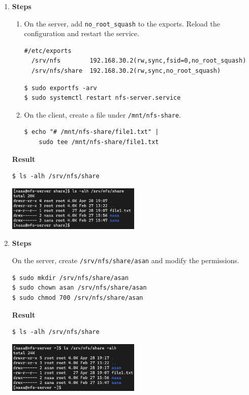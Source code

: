 \documentclass[12pt, a4paper]{article}
\begin{document}
\begin{enumerate}[label=(\alph*)]
    \pagebreak
    \item \textbf{Steps}
    \begin{enumerate}[label=(\arabic*)]
      \item On the server, add \verb|no_root_squash| to the exports. Reload
      the configuration and restart the service.
      \begin{Verbatim}[frame=single]
  #/etc/exports
  /srv/nfs        192.168.30.2(rw,sync,fsid=0,no_root_squash)
  /srv/nfs/share  192.168.30.2(rw,sync,no_root_squash)
      \end{Verbatim}
      \begin{Verbatim}[frame=single]
$ sudo exportfs -arv
$ sudo systemctl restart nfs-server.service
      \end{Verbatim}
      \item On the client, create a file under \verb|/mnt/nfs-share|.
      \begin{Verbatim}[frame=single]
$ echo "# /mnt/nfs-share/file1.txt" |
    sudo tee /mnt/nfs-share/file1.txt
      \end{Verbatim}
    \end{enumerate}

    \textbf{Result}
    \begin{Verbatim}[frame=single]
$ ls -alh /srv/nfs/share
    \end{Verbatim}

    \includegraphics[width=0.5\textwidth]{1-b_result.png}

    \item \textbf{Steps}

    On the server, create \verb|/srv/nfs/share/asan| and modify the permissions.
    \begin{Verbatim}[frame=single]
$ sudo mkdir /srv/nfs/share/asan
$ sudo chown asan /srv/nfs/share/asan
$ sudo chmod 700 /srv/nfs/share/asan
    \end{Verbatim}

    \textbf{Result}
    \begin{Verbatim}[frame=single]
$ ls -alh /srv/nfs/share
    \end{Verbatim}

    \includegraphics[width=0.5\textwidth]{1-c_result.png}
  \end{enumerate}
\end{document}

